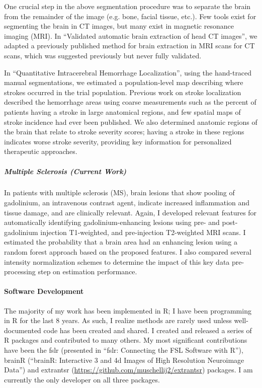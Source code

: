 \documentclass[12pt,a4paper]{article}
\begin{document}
One crucial step in the above segmentation procedure was to separate the brain from the remainder of the image (e.g. bone, facial tissue, etc.).  Few tools exist for segmenting the brain in CT images, but many exist in magnetic resonance imaging (MRI).  In ``Validated automatic brain extraction of head CT images'', we adapted a previously published method for brain extraction in MRI scans for CT scans, which was suggested previously but never fully validated.  

In ``Quantitative Intracerebral Hemorrhage Localization'', using the hand-traced manual segmentations, we estimated a population-level map describing where strokes occurred in the trial population.  Previous work on stroke localization described the hemorrhage areas using coarse measurements such as the percent of patients having a stroke in large anatomical regions, and few spatial maps of stroke incidence had ever been published.  We also determined anatomic regions of the brain that relate to stroke severity scores; having a stroke in these regions indicates worse stroke severity, providing key information for personalized therapeutic approaches.

\vspace{-1em}
\subparagraph{Multiple Sclerosis (Current Work)} In patients with multiple sclerosis (MS), brain lesions that show pooling of gadolinium, an intravenous contrast agent, indicate increased inflammation  and tissue damage, and are clinically relevant.  Again, I developed relevant features for automatically identifying  gadolinium-enhancing lesions using pre- and post-gadolinium injection T1-weighted, and pre-injection T2-weighted MRI scans.  I estimated the probability that a brain area had an enhancing lesion using a random forest approach based on the proposed features.  I also compared several intensity normalization schemes to determine the impact of this key data pre-processing step on estimation performance.  

\paragraph{Software Development} The majority of my work has been implemented in R; I have been programming in R for the last 8 years.  As such, I realize methods are rarely used unless well-documented code has been created and shared.  I created and released a series of R packages and contributed to many others.  My most significant contributions have been the fslr (presented in ``fslr: Connecting the FSL Software with R''), brainR (``brainR: Interactive 3 and 4d Images of High Resolution Neuroimage Data'') and extrantsr (\url{https://github.com/muschellij2/extrantsr}) packages.  I am currently the only developer on all three packages.
\end{document}
